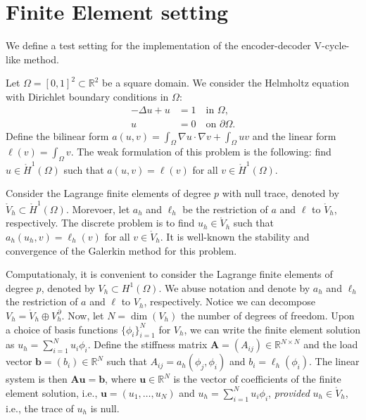 \section{Finite Element setting}
\label{sec:fem}

We define a test setting for the implementation of the encoder-decoder V-cycle-like method.

Let $\Omega = [0,1]^2 \subset \mathbb{R}^2$ be a square domain.
We consider the Helmholtz equation with Dirichlet boundary conditions in $\Omega$:
\begin{subequations}
    \begin{align}
        -\Delta u + u &= 1 \quad \text{in } \Omega, \\
        u &= 0 \quad \text{on } \partial \Omega.
    \end{align}
\end{subequations}
Define the bilinear form \(a(u,v) = \int_{\Omega} \nabla u \cdot \nabla v + \int_{\Omega} uv\) and the linear form \(\ell(v) = \int_{\Omega} v\).
The weak formulation of this problem is the following:
find \(u \in \mathring{H}^1(\Omega)\) such that \(a(u,v) = \ell(v)\) for all \(v \in \mathring{H}^1(\Omega)\).

Consider the Lagrange finite elements of degree \(p\) with null trace, denoted by \(\mathring{V}_h \subset \mathring{H}^1(\Omega)\).
Morevoer, let \(a_h\) and \(\ell_h\) be the restriction of \(a\) and \(\ell\) to \(\mathring{V}_h\), respectively.
The discrete problem is to find \(u_h \in \mathring{V}_h\) such that \(a_h(u_h,v) = \ell_h(v)\) for all \(v \in \mathring{V}_h\).
It is well-known the stability and convergence of the Galerkin method for this problem.

Computationaly, it is convenient to consider the Lagrange finite elements of degree \(p\), denoted by \(V_h \subset H^1(\Omega)\).
We abuse notation and denote by \(a_h\) and \(\ell_h\) the restriction of \(a\) and \(\ell\) to \(V_h\), respectively.
Notice we can decompose \(V_h = \mathring{V}_h \oplus V_h^\partial\).
Now, let \( N = \dim(V_h) \) the number of degrees of freedom.
Upon a choice of basis functions \( \{ \phi_i \}_{i=1}^{N} \) for \(V_h\), we can write the finite element solution as \(u_h = \sum_{i=1}^{N} u_i \phi_i\).
Define the stiffness matrix \(\mathbf{A} = (A_{ij}) \in \mathbb{R}^{N \times N}\) and the load vector \(\mathbf{b} = (b_i) \in \mathbb{R}^{N}\) such that \(A_{ij} = a_h(\phi_j, \phi_i)\) and \(b_i = \ell_h(\phi_i)\).
The linear system is then \(\mathbf{A} \mathbf{u} = \mathbf{b}\), where \(\mathbf{u} \in \mathbb{R}^{N}\) is the vector of coefficients of the finite element solution, i.e., \(\mathbf{u} = (u_1, \ldots, u_N)\) and \(u_h = \sum_{i=1}^{N} u_i \phi_i\), \emph{provided} \(u_h \in \mathring{V}_h\), i.e., the trace of \(u_h\) is null.

